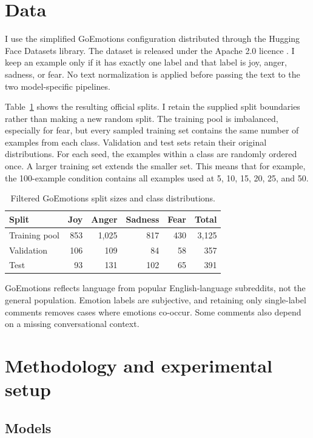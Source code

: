 \documentclass[11pt,a4paper]{article}
\begin{document}
\section{Data}

I use the simplified GoEmotions configuration distributed through the Hugging
Face Datasets library. The dataset is released under
the Apache 2.0 licence \citep{demszky2020goemotions}. I keep an example only if it has exactly one label and
that label is joy, anger, sadness, or fear. No text normalization is applied
before passing the text to the two model-specific pipelines.

Table~\ref{tab:data} shows the resulting official splits. I retain the supplied
split boundaries rather than making a new random split. The training pool is
imbalanced, especially for fear, but every sampled training set contains the
same number of examples from each class. Validation and test sets retain their
original distributions. For each seed, the examples within a class are randomly
ordered once. A larger training set extends the smaller set. This means that for example, the
100-example condition contains all examples used at 5, 10, 15, 20, 25, and 50.

\begin{table}[ht]
  \centering
  \caption{Filtered GoEmotions split sizes and class distributions.}
  \label{tab:data}
  \small
  \begin{tabular}{lrrrrr}
    \toprule
    Split & Joy & Anger & Sadness & Fear & Total \\
    \midrule
    Training pool & 853 & 1,025 & 817 & 430 & 3,125 \\
    Validation    & 106 & 109   & 84  & 58  & 357 \\
    Test          & 93  & 131   & 102 & 65  & 391 \\
    \bottomrule
  \end{tabular}
\end{table}

GoEmotions reflects language from popular English-language subreddits, not the
general population. Emotion labels are subjective, and retaining only
single-label comments removes cases where emotions co-occur. Some comments also
depend on a missing conversational context.
\section{Methodology and experimental setup}

\subsection{Models}
\end{document}
